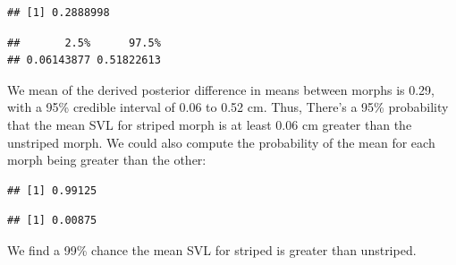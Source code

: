 \documentclass[
]{book}
\newenvironment{Shaded}{\begin{snugshade}}{\end{snugshade}}
\newcommand{\AttributeTok}[1]{\textcolor[rgb]{0.13,0.29,0.53}{#1}}
\newcommand{\CommentTok}[1]{\textcolor[rgb]{0.56,0.35,0.01}{\textit{#1}}}
\newcommand{\DecValTok}[1]{\textcolor[rgb]{0.00,0.00,0.81}{#1}}
\newcommand{\FloatTok}[1]{\textcolor[rgb]{0.00,0.00,0.81}{#1}}
\newcommand{\FunctionTok}[1]{\textcolor[rgb]{0.13,0.29,0.53}{\textbf{#1}}}
\newcommand{\NormalTok}[1]{#1}
\newcommand{\SpecialCharTok}[1]{\textcolor[rgb]{0.81,0.36,0.00}{\textbf{#1}}}
\begin{document}
\begin{verbatim}
## [1] 0.2888998
\end{verbatim}

\begin{Shaded}
\end{Shaded}

\begin{verbatim}
##       2.5%      97.5% 
## 0.06143877 0.51822613
\end{verbatim}

We mean of the derived posterior difference in means between morphs is 0.29, with a 95\% credible interval of 0.06 to 0.52 cm. Thus, There's a 95\% probability that the mean SVL for striped morph is at least 0.06 cm greater than the unstriped morph. We could also compute the probability of the mean for each morph being greater than the other:

\begin{Shaded}
\end{Shaded}

\begin{verbatim}
## [1] 0.99125
\end{verbatim}

\begin{Shaded}
\end{Shaded}

\begin{verbatim}
## [1] 0.00875
\end{verbatim}

We find a 99\% chance the mean SVL for striped is greater than unstriped.
\end{document}
